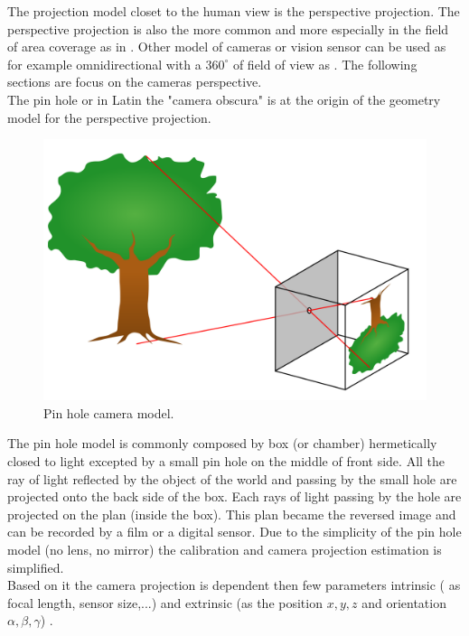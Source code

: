The  projection model closet to the human view is the perspective projection. The perspective projection is also the more common and more especially in the field of area coverage as in \cite{101*topcuoglu2009,33*reddy2012,8*zhou2011,82*chrysostomou2012,22*zhao2008}. Other model of cameras or vision sensor can be used as for example omnidirectional with a $360^{\circ}$ of field of view as \citep{43*erdem2006,150*chakrabarty2002,174*zhang2016}. The following sections are focus on the cameras perspective.  \\
The pin hole or in Latin the "camera obscura"  is at the origin of the geometry model for the perspective projection.\\
\begin{figure}[t!]
\begin{center}
   \includegraphics[width=\linewidth]{img/PinholeCam.png}
  \caption{ Pin hole camera model.}\label{fig:PanTiltRoll}
  \endminipage\hfill
\end{center}
\end{figure} 
 The pin hole model is commonly composed by box (or chamber) hermetically closed to light excepted by a small pin hole on the middle of front side. All the ray of light reflected by the object of the world and passing by the small hole are projected onto the back side of the box. Each rays of light passing by the hole are  projected on the plan (inside the box). This plan became the reversed image and can be recorded by a film or a digital sensor. 
 Due to the simplicity of the pin hole model (no lens, no mirror) the calibration and camera projection  estimation is simplified.\\
  Based on it the camera projection is dependent then few parameters intrinsic ( as focal length, sensor size,...) and extrinsic (as the position $x,y,z$ and orientation $\alpha,\beta,\gamma$) . 
  
